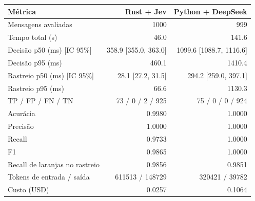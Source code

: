 \begin{tabular}{lrr}
\toprule
Métrica & Rust + Jev & Python + DeepSeek \\
\midrule
Mensagens avaliadas & 1000 & 999 \\
Tempo total (s) & 46.0 & 141.6 \\
Decisão p50 (ms) [IC 95\%] & 358.9 [355.0, 363.0] & 1099.6 [1088.7, 1116.6] \\
Decisão p95 (ms) & 460.1 & 1410.4 \\
Rastreio p50 (ms) [IC 95\%] & 28.1 [27.2, 31.5] & 294.2 [259.0, 397.1] \\
Rastreio p95 (ms) & 66.6 & 1130.3 \\
TP / FP / FN / TN & 73 / 0 / 2 / 925 & 75 / 0 / 0 / 924 \\
Acurácia & 0.9980 & 1.0000 \\
Precisão & 1.0000 & 1.0000 \\
Recall & 0.9733 & 1.0000 \\
F1 & 0.9865 & 1.0000 \\
Recall de laranjas no rastreio & 0.9856 & 0.9851 \\
Tokens de entrada / saída & 611513 / 148729 & 320421 / 39782 \\
Custo (USD) & 0.0257 & 0.1064 \\
\bottomrule
\end{tabular}
